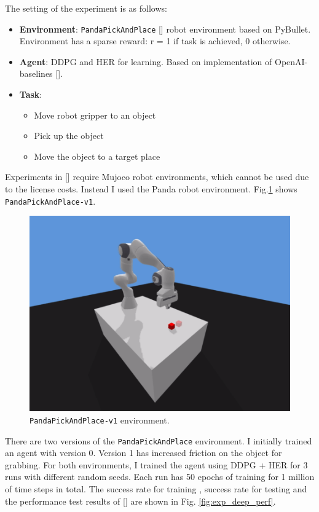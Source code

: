 \documentclass[conference]{IEEEtran}
\begin{document}
The setting of the experiment is as follows:
\begin{itemize}
\item \textbf{Environment}: \texttt{PandaPickAndPlace} [\cite{gallouedec2021multi}] robot environment based on PyBullet. Environment has a sparse reward: r = 1 if task is achieved, 0 otherwise.
\item \textbf{Agent}: DDPG and HER for learning. Based on implementation of OpenAI-baselines [\cite{baselines}].
\item \textbf{Task}:
    \begin{itemize}
        \item Move robot gripper to an object
        \item Pick up the object
        \item Move the object to a target place
    \end{itemize}
\end{itemize}

Experiments in [\cite{plappert2018multi}] require Mujoco robot environments, which cannot be used due to the license costs. Instead I used the Panda robot environment. Fig.\ref{fig:PandaPickAndPlace} shows \texttt{PandaPickAndPlace-v1}.
\begin{figure}[ht]
\centering
\includegraphics[width=0.6\columnwidth]{img/PandaPickAndPlace-v1.png}
\caption{\texttt{PandaPickAndPlace-v1} environment.}
\label{fig:PandaPickAndPlace}
\end{figure}

There are two versions of the \texttt{PandaPickAndPlace} environment. I initially trained an agent with version 0. Version 1 has increased friction on the object for grabbing. For both environments, I trained the agent using DDPG + HER for 3 runs with different random seeds. Each run has 50 epochs of training for 1 million of time steps in total. The success rate for training , success rate for testing and the performance test results of [\cite{plappert2018multi}] are shown in Fig. \ref{fig:exp_deep_perf}.
\end{document}
